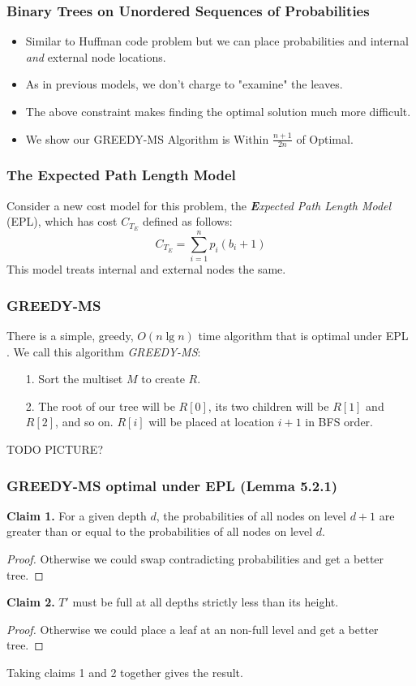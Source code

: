 \documentclass{beamer}
\theoremstyle{plain}
\begin{document}
\begin{frame} \frametitle{Binary Trees on Unordered Sequences of Probabilities}
\begin{itemize}
\item Similar to Huffman code problem but we can place probabilities and internal \textit{and} external node locations.
\item As in previous models, we don't charge to "examine" the leaves.
\item The above constraint makes finding the optimal solution much more difficult.
\item We show our GREEDY-MS Algorithm is Within $\frac{n+1}{2n}$ of Optimal.
\end{itemize}
\end{frame}



\begin{frame} \frametitle{The \textbf{E}xpected Path Length Model}
Consider a new cost model for this problem, the \textit{\textbf{E}xpected Path Length Model} (EPL), which has cost $C_{T_E}$ defined as follows:
\begin{equation}
C_{T_E} = \sum_{i=1}^{n} p_i(b_i+1)
\end{equation}
This model treats internal and external nodes the same.
\end{frame}

\begin{frame} \frametitle{GREEDY-MS}
There is a simple, greedy, $O(n \lg n)$ time algorithm that is optimal under EPL \cite{golin2012huffman}. We call this algorithm \textit{GREEDY-MS}:

\begin{itemize}
\item[1.] Sort the multiset $M$ to create $R$.

\item[2.] The root of our tree will be $R[0]$, its two children will be $R[1]$ and $R[2]$, and so on. $R[i]$ will be placed at location $i+1$ in BFS order.
\end{itemize}
TODO PICTURE?
\end{frame}

\begin{frame}\frametitle{GREEDY-MS optimal under EPL (Lemma 5.2.1)}
\textbf{Claim 1.}\label{Claim-EPL}
For a given depth $d$, the probabilities of all nodes on level $d+1$ are greater than or equal to the probabilities of all nodes on level $d$.
\begin{proof}
Otherwise we could swap contradicting probabilities and get a better tree.
\end{proof}

\noindent \textbf{Claim 2.}\label{Claim-EPL2}
$T'$ must be full at all depths strictly less than its height.
\begin{proof}
Otherwise we could place a leaf at an non-full level and get a better tree.
\end{proof}

Taking claims 1 and 2 together gives the result.
\end{frame}
\end{document}
